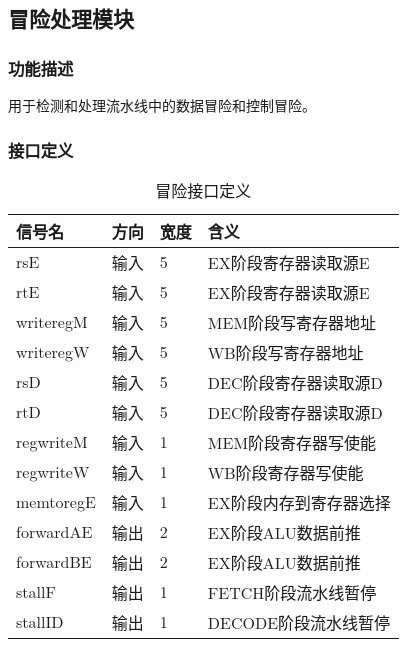 \subsection{冒险处理模块}\label{sub:hazard}
\subsubsection{功能描述}
用于检测和处理流水线中的数据冒险和控制冒险。
\subsubsection{接口定义}
\begin{table}[htp]
	\caption{冒险接口定义}\label{tab:hazarddef}
	\begin{center}
		\begin{tabular}{|l|l|l|p{8cm}|}
		\hline
		\textbf{信号名} & \textbf{方向} & \textbf{宽度} & \textbf{含义}\\ \hline \hline
		rsE        & 输入  & 5  & EX阶段寄存器读取源E \\ 
		rtE        & 输入  & 5  & EX阶段寄存器读取源E \\ 
		writeregM  & 输入  & 5  & MEM阶段写寄存器地址 \\ 
		writeregW  & 输入  & 5  & WB阶段写寄存器地址 \\ 
		rsD        & 输入  & 5  & DEC阶段寄存器读取源D \\ 
		rtD        & 输入  & 5  & DEC阶段寄存器读取源D \\ 
		regwriteM  & 输入  & 1  & MEM阶段寄存器写使能 \\ 
		regwriteW  & 输入  & 1  & WB阶段寄存器写使能 \\ 
		memtoregE  & 输入  & 1  & EX阶段内存到寄存器选择 \\ 
		forwardAE  & 输出  & 2  & EX阶段ALU数据前推 \\ 
		forwardBE  & 输出  & 2  & EX阶段ALU数据前推 \\ 
		stallF     & 输出  & 1  & FETCH阶段流水线暂停 \\ 
		stallID    & 输出  & 1  & DECODE阶段流水线暂停 \\ 
		\hline
		\end{tabular}
	\end{center}
	\end{table}
